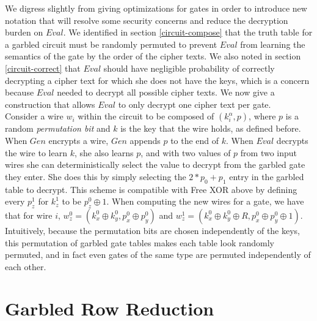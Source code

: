 \documentclass{article}
\begin{document}
We digress slightly from giving optimizations for gates in order to introduce new notation that will resolve some security concerns and reduce the decryption burden on $Eval$. We identified in section \ref{circuit-compose} that the truth table for a garbled circuit must be randomly permuted to prevent $Eval$ from learning the semantics of the gate by the order of the cipher texts. We also noted in section \ref{circuit-correct} that $Eval$ should have negligible probability of correctly decrypting a cipher text for which she does not have the keys, which is a concern because $Eval$ needed to decrypt all possible cipher texts. We now give a construction that allows $Eval$ to only decrypt one cipher text per gate. \\

Consider a wire $w_i$ within the circuit to be composed of $(k_{i}^{\alpha},p)$, where $p$ is a random \textit{permutation bit} and $k$ is the key that the wire holds, as defined before. When $Gen$ encrypts a wire, $Gen$ appends $p$ to the end of $k$. When $Eval$ decrypts the wire to learn $k$, she also learns $p$, and with two values of $p$ from two input wires she can deterministically select the value to decrypt from the garbled gate they enter. She does this by simply selecting the $2*p_0 + p_1$ entry in the garbled table to decrypt. This scheme is compatible with Free XOR above by defining every $p_z^1$ for $k_z^1$ to be $p_z^0 \oplus 1$. When computing the new wires for a gate, we have that for wire $i$, $w_z^0 =  (k_x^0 \oplus k_y^0, p_x^0 \oplus p_y^0) $ and $w_z^1 =  (k_x^0 \oplus k_y^0 \oplus R, p_x^0 \oplus p_y^0 \oplus 1) $.   \\

Intuitively, because the permutation bits are chosen independently of the keys, this permutation of garbled gate tables makes each table look randomly permuted, and in fact even gates of the same type are permuted independently of each other.

\section{Garbled Row Reduction}
\end{document}
